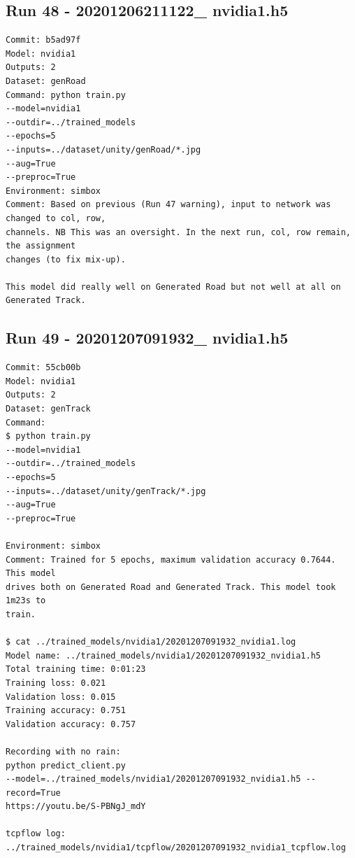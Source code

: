 \subsection{Run 48 - 20201206211122\_ nvidia1.h5}
\begin{verbatim}
Commit: b5ad97f
Model: nvidia1
Outputs: 2
Dataset: genRoad
Command: python train.py
--model=nvidia1
--outdir=../trained_models
--epochs=5
--inputs=../dataset/unity/genRoad/*.jpg
--aug=True
--preproc=True
Environment: simbox
Comment: Based on previous (Run 47 warning), input to network was changed to col, row,
channels. NB This was an oversight. In the next run, col, row remain, the assignment
changes (to fix mix-up).

This model did really well on Generated Road but not well at all on Generated Track.
\end{verbatim}

\subsection{Run 49 - 20201207091932\_ nvidia1.h5}
\label{app_res:49}
\begin{verbatim}
Commit: 55cb00b
Model: nvidia1
Outputs: 2
Dataset: genTrack
Command: 
$ python train.py
--model=nvidia1
--outdir=../trained_models
--epochs=5
--inputs=../dataset/unity/genTrack/*.jpg
--aug=True
--preproc=True

Environment: simbox
Comment: Trained for 5 epochs, maximum validation accuracy 0.7644. This model
drives both on Generated Road and Generated Track. This model took 1m23s to
train.

$ cat ../trained_models/nvidia1/20201207091932_nvidia1.log
Model name: ../trained_models/nvidia1/20201207091932_nvidia1.h5
Total training time: 0:01:23
Training loss: 0.021
Validation loss: 0.015
Training accuracy: 0.751
Validation accuracy: 0.757

Recording with no rain:
python predict_client.py
--model=../trained_models/nvidia1/20201207091932_nvidia1.h5 --record=True
https://youtu.be/S-PBNgJ_mdY

tcpflow log:
../trained_models/nvidia1/tcpflow/20201207091932_nvidia1_tcpflow.log

\end{verbatim}

